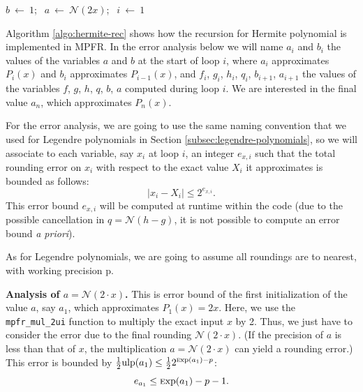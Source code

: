 \documentclass[12pt]{amsart}
\def\ulp{{\rm ulp}}
\def\Exp{{\rm \textsc exp}}
\def\N{{\mathcal N}}
\begin{document}
\begin{algorithm}[H]
  \caption{\texttt{mpfr\_hermite} recursion}
  \label{algo:hermite-rec}
  \BlankLine
  $b~\gets{}~1$;
  $~~a~\gets~\N{}(2x)$;
  $~~i~\gets~1$\;
  \While{$i<n$}{
    $f~\gets~\N{}(2 \cdot{} x)$\;
    $g~\gets~\N{}(b \cdot{} (2 * i))$\;
    $h\gets~\N{}(f \cdot{} a)$\;
    $q~\gets~\N{}(h - g)$\;
    \BlankLine
    $b~\gets~a$\;
    $a~\gets~q$\;
    $i~\gets~i + 1$\;
  }
\end{algorithm}
\vspace{.3cm}

Algorithm \ref{algo:hermite-rec} shows how the recursion for Hermite polynomial
is implemented in MPFR. In the error analysis below we will name $a_i$ and
$b_i$ the values of the variables $a$ and $b$ at the start of loop $i$, where
$a_i$ approximates $P_i(x)$ and $b_i$ approximates $P_{i-1}(x)$, and $f_i$,
$g_i$, $h_i$, $q_i$, $b_{i+1}$, $a_{i+1}$ the values of the variables $f$, $g$, $h$,
$q$, $b$, $a$ computed during loop $i$. We are interested in the final value
$a_n$, which approximates $P_n(x)$.

For the error analysis, we are going to use the same naming convention that
we used for Legendre polynomials in Section
\ref{subsec:legendre-polynomials}, so we will associate to each variable,
say $x_i$ at loop $i$, an integer $e_{x,i}$ such that the total rounding
error on $x_i$ with respect to the exact value $X_i$ it approximates is
bounded as follows:
\[ |x_i - X_i| \le 2^{e_{x,i}}. \]
This error bound $e_{x,i}$ will be computed at runtime within the code
(due to the possible cancellation in $q = \N{}(h - g)$, it is not possible
to compute an error bound \textit{a priori}).

As for Legendre polynomials, we are going to assume all roundings are to
nearest, with working precision p.

\par\noindent
\textbf{Analysis of $a = \N{}(2\cdot{}x)$.} This is error bound of the
first initialization of the value $a$, say $a_1$, which approximates $P_1(x)=2x$.
Here, we use the
\texttt{mpfr\_mul\_2ui} function to multiply the exact input $x$ by 2.
Thus, we just have to consider the error due to the final rounding
$\N{}(2\cdot{}x)$. (If the precision of $a$ is less than that of $x$,
the multiplication $a = \N{}(2\cdot{}x)$ can yield a rounding error.)
This error is bounded by
$\frac{1}{2} \ulp(a_1) \le \frac{1}{2} 2^{\Exp(a_1) - p}$:
\[ e_{a_1} \le \Exp(a_1) - p - 1. \]
\end{document}
